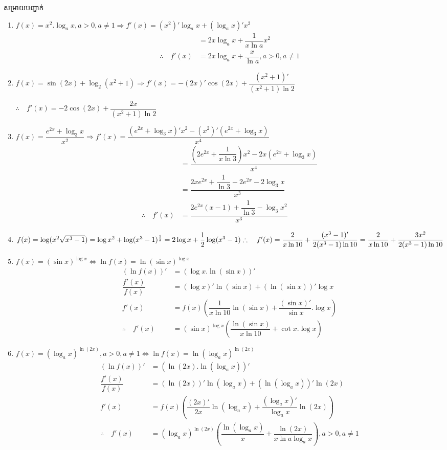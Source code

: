 \documentclass[12pt,fleqn]{book} %
\newcommand{\solution}{{\begin{center}\kml \color{blue} សម្រាយបញ្ជាក់\end{center} }}
\begin{document}
\solution 
\begin{enumerate}
\item $f(x)=x^2.\log_a x, a>0,a\neq 1\Longrightarrow f'(x)=(x^2)'\log_a x+\left(\log_a x \right)'x^2$
\begin{align*}
&=2x\log_a x+\dfrac{1}{x\ln a}x^2\\
\therefore \quad f'(x)&=2x\log _a x+\dfrac{x}{\ln a} , a>0,a\neq 1
\end{align*}
\item $f(x)=\sin (2x)+\log_2 (x^2+1)\Longrightarrow f'(x)=-(2x)'\cos (2x)+\dfrac{(x^2+1)'}{(x^2+1)\ln 2}$
\begin{center}
$\therefore \quad f'(x)=-2\cos(2x)+\dfrac{2x}{(x^2+1)\ln 2}$
\end{center}
\item $f(x)=\dfrac{e^{2x}+\log_3 x}{x^2}\Longrightarrow f'(x)=\dfrac{(e^{2x}+\log_3 x)'x^2-(x^2)'(e^{2x}+\log_3 x)}{x^4}$
\begin{align*}
&=\dfrac{(2e^{2x}+\dfrac{1}{x\ln 3})x^2-2x(e^{2x}+\log_3 x)}{x^4}\\
&=\dfrac{2xe^{2x}+\dfrac{1}{\ln 3}-2e^{2x}-2\log_3 x}{x^3}\\
\therefore \quad f'(x)&=\dfrac{2e^{2x}(x-1)+\dfrac{1}{\ln 3}-\log_3x^2}{x^3}
\end{align*}
\item $f(x)=\log (x^2 \sqrt{x^3-1})=\log x^2 +\log (x^3-1)^{\frac{1}{2}}=2\log x+\dfrac{1}{2}\log (x^3-1)\\
\therefore \quad f'(x)=\dfrac{2}{x\ln 10}+\dfrac{(x^3-1)'}{2(x^3-1)\ln 10}=\dfrac{2}{x\ln 10}+\dfrac{3x^2}{2(x^3-1)\ln 10} $
\item $f(x)=(\sin x)^{\log x}\Longleftrightarrow \ln f(x)=\ln (\sin x)^{\log x}$
\begin{align*}
\left(\ln f(x) \right)'&=(\log x. \ln (\sin x))'\\
\dfrac{f'(x)}{f(x)}&=(\log x)'\ln (\sin x)+(\ln (\sin x))'\log x\\
f'(x)&=f(x)\left(\dfrac{1}{x\ln 10}\ln (\sin x)+\dfrac{(\sin x)' }{\sin x}.\log x \right)\\
\therefore \quad f'(x)&=(\sin x)^{\log x}\left(\dfrac{\ln (\sin x)}{x\ln 10} +\cot x.\log x\right)
\end{align*}
\item $f(x)=(\log _a x)^{\ln (2x)},a>0,a\neq 1\Longleftrightarrow \ln f(x)=\ln (\log_a x)^{\ln (2x)}$
\begin{align*}
\left(\ln f(x) \right)'&=\left(\ln (2x).\ln (\log_a x) \right)'\\
\dfrac{f'(x)}{f(x)}&=(\ln (2x))'\ln (\log_a x)+(\ln (\log _a x))' \ln (2x)\\
f'(x)&=f(x)\left(\dfrac{(2x)'}{2x}\ln (\log_a x)+\dfrac{(\log _a x)'}{\log_a x}\ln (2x) \right)\\
\therefore \quad f'(x)&=(\log _a x)^{\ln (2x)}\left(\dfrac{\ln (\log_a x)}{x}+\dfrac{\ln (2x)}{x\ln a \log_a x} \right) ,a>0,a\neq 1
\end{align*}
\end{enumerate}
\end{document}

